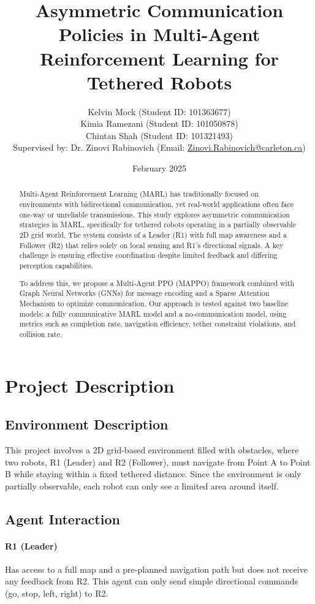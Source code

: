 \documentclass[a4paper,11pt]{article}
\title{Asymmetric Communication Policies in Multi-Agent Reinforcement Learning for Tethered Robots}
\author{
  Kelvin Mock (Student ID: 101363677)
  \\
  Kimia Ramezani (Student ID: 101050878)
  \\
  Chintan Shah (Student ID: 101321493)
  \\
  Supervised by: Dr. Zinovi Rabinovich (Email: \url{Zinovi.Rabinovich@carleton.ca})
}
\date{February 2025}
\begin{document}
\maketitle

\begin{abstract}
Multi-Agent Reinforcement Learning (MARL) has traditionally focused on environments with bidirectional communication, yet real-world applications often face one-way or unreliable transmissions. This study explores asymmetric communication strategies in MARL, specifically for tethered robots operating in a partially observable 2D grid world. The system consists of a Leader (R1) with full map awareness and a Follower (R2) that relies solely on local sensing and R1’s directional signals. A key challenge is ensuring effective coordination despite limited feedback and differing perception capabilities.

To address this, we propose a Multi-Agent PPO (MAPPO) framework combined with Graph Neural Networks (GNNs) for message encoding and a Sparse Attention Mechanism to optimize communication. Our approach is tested against two baseline models: a fully communicative MARL model and a no-communication model, using metrics such as completion rate, navigation efficiency, tether constraint violations, and collision rate.
\end{abstract}

\section{Project Description}

\subsection{Environment Description}

This project involves a 2D grid-based environment filled with obstacles, where two robots, R1 (Leader) and R2 (Follower), must navigate from Point A to Point B while staying within a fixed tethered distance. Since the environment is only partially observable, each robot can only see a limited area around itself.

\subsection{Agent Interaction}

\paragraph{R1 (Leader)} Has access to a full map and a pre-planned navigation path but does not receive any feedback from R2. This agent can only send simple directional commands (go, stop, left, right) to R2.
\end{document}
